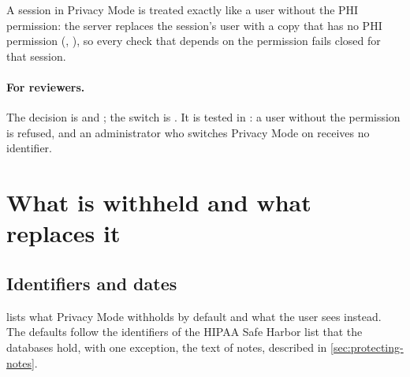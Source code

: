 A session in Privacy Mode is treated exactly like a user without the PHI permission: the server
replaces the session's user with a copy that has no PHI permission (,
), so every check that depends on the permission fails closed for
that session.

\paragraph{For reviewers.} The decision is   and
; the switch is  . It is tested in
: a user without the permission is refused, and an administrator
who switches Privacy Mode on receives no identifier.

\section{What is withheld and what replaces it}
\label{sec:protecting-withheld}

\subsection{Identifiers and dates}
\label{sec:protecting-identifiers}

 lists what Privacy Mode withholds by default and what the user sees
instead. The defaults follow the identifiers of the HIPAA Safe Harbor list that the databases
hold, with one exception, the text of notes, described in \cref{sec:protecting-notes}.

